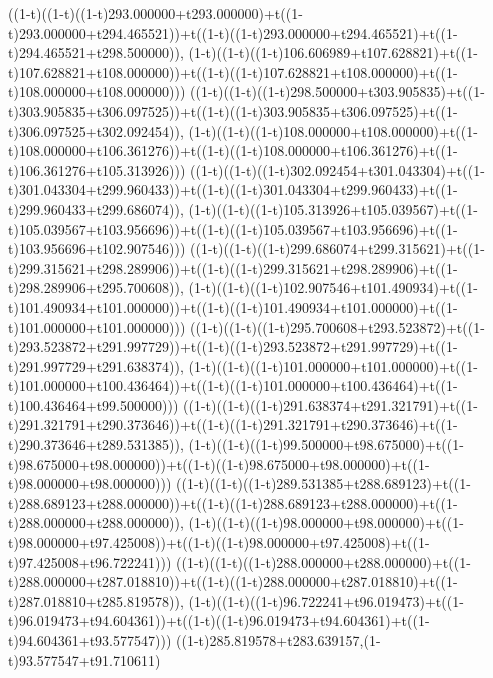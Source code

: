 ((1-t)((1-t)((1-t)293.000000+t293.000000)+t((1-t)293.000000+t294.465521))+t((1-t)((1-t)293.000000+t294.465521)+t((1-t)294.465521+t298.500000)),                                     (1-t)((1-t)((1-t)106.606989+t107.628821)+t((1-t)107.628821+t108.000000))+t((1-t)((1-t)107.628821+t108.000000)+t((1-t)108.000000+t108.000000)))
((1-t)((1-t)((1-t)298.500000+t303.905835)+t((1-t)303.905835+t306.097525))+t((1-t)((1-t)303.905835+t306.097525)+t((1-t)306.097525+t302.092454)),                                     (1-t)((1-t)((1-t)108.000000+t108.000000)+t((1-t)108.000000+t106.361276))+t((1-t)((1-t)108.000000+t106.361276)+t((1-t)106.361276+t105.313926)))
((1-t)((1-t)((1-t)302.092454+t301.043304)+t((1-t)301.043304+t299.960433))+t((1-t)((1-t)301.043304+t299.960433)+t((1-t)299.960433+t299.686074)),                                     (1-t)((1-t)((1-t)105.313926+t105.039567)+t((1-t)105.039567+t103.956696))+t((1-t)((1-t)105.039567+t103.956696)+t((1-t)103.956696+t102.907546)))
((1-t)((1-t)((1-t)299.686074+t299.315621)+t((1-t)299.315621+t298.289906))+t((1-t)((1-t)299.315621+t298.289906)+t((1-t)298.289906+t295.700608)),                                     (1-t)((1-t)((1-t)102.907546+t101.490934)+t((1-t)101.490934+t101.000000))+t((1-t)((1-t)101.490934+t101.000000)+t((1-t)101.000000+t101.000000)))
((1-t)((1-t)((1-t)295.700608+t293.523872)+t((1-t)293.523872+t291.997729))+t((1-t)((1-t)293.523872+t291.997729)+t((1-t)291.997729+t291.638374)),                                     (1-t)((1-t)((1-t)101.000000+t101.000000)+t((1-t)101.000000+t100.436464))+t((1-t)((1-t)101.000000+t100.436464)+t((1-t)100.436464+t99.500000)))
((1-t)((1-t)((1-t)291.638374+t291.321791)+t((1-t)291.321791+t290.373646))+t((1-t)((1-t)291.321791+t290.373646)+t((1-t)290.373646+t289.531385)),                                     (1-t)((1-t)((1-t)99.500000+t98.675000)+t((1-t)98.675000+t98.000000))+t((1-t)((1-t)98.675000+t98.000000)+t((1-t)98.000000+t98.000000)))
((1-t)((1-t)((1-t)289.531385+t288.689123)+t((1-t)288.689123+t288.000000))+t((1-t)((1-t)288.689123+t288.000000)+t((1-t)288.000000+t288.000000)),                                     (1-t)((1-t)((1-t)98.000000+t98.000000)+t((1-t)98.000000+t97.425008))+t((1-t)((1-t)98.000000+t97.425008)+t((1-t)97.425008+t96.722241)))
((1-t)((1-t)((1-t)288.000000+t288.000000)+t((1-t)288.000000+t287.018810))+t((1-t)((1-t)288.000000+t287.018810)+t((1-t)287.018810+t285.819578)),                                     (1-t)((1-t)((1-t)96.722241+t96.019473)+t((1-t)96.019473+t94.604361))+t((1-t)((1-t)96.019473+t94.604361)+t((1-t)94.604361+t93.577547)))
((1-t)285.819578+t283.639157,(1-t)93.577547+t91.710611)
